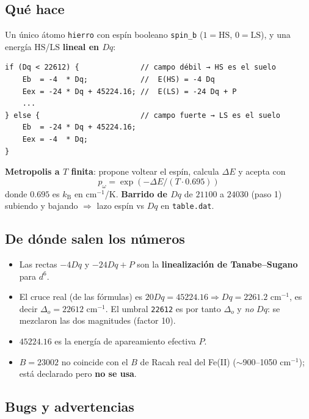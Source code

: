 \documentclass[11pt,a4paper]{article}
\newcommand{\HS}{\mathrm{HS}}
\newcommand{\LS}{\mathrm{LS}}
\newcommand{\Dq}{Dq}
\newcommand{\kb}{k_{\mathrm{B}}}
\begin{document}
\subsection{Qué hace}

Un único átomo \texttt{hierro} con espín booleano \texttt{spin\_b}
($1=\HS$, $0=\LS$), y una energía $\HS$/$\LS$ \textbf{lineal en $\Dq$}:

\begin{verbatim}
if (Dq < 22612) {              // campo débil → HS es el suelo
    Eb  = -4  * Dq;            //  E(HS) = -4 Dq
    Eex = -24 * Dq + 45224.16; //  E(LS) = -24 Dq + P
    ...
} else {                       // campo fuerte → LS es el suelo
    Eb  = -24 * Dq + 45224.16;
    Eex = -4  * Dq;
}
\end{verbatim}

\textbf{Metropolis a $T$ finita}: propone voltear el espín, calcula $\Delta E$ y
acepta con
\begin{equation}
p_{\omega} = \exp\!\left(-\Delta E/(T \cdot 0.695)\right)
\end{equation}
donde $0.695$ es $\kb$ en cm$^{-1}$/K. \textbf{Barrido de $\Dq$} de $21100$ a
$24030$ (paso 1) subiendo y bajando $\Rightarrow$ lazo espín vs $\Dq$ en
\texttt{table.dat}.

\subsection{De dónde salen los números}

\begin{itemize}
\item Las rectas $-4\Dq$ y $-24\Dq+P$ son la \textbf{linealización de
  Tanabe--Sugano} para $d^6$.
\item El cruce real (de las fórmulas) es $20\Dq = 45224.16 \Rightarrow
  \Dq = 2261.2$ cm$^{-1}$, es decir $\Delta_o = 22612$ cm$^{-1}$. El umbral
  \texttt{22612} es por tanto $\Delta_o$ y \emph{no} $\Dq$: se mezclaron las dos
  magnitudes (factor 10).
\item $45224.16$ es la energía de apareamiento efectiva $P$.
\item $B=23002$ no coincide con el $B$ de Racah real del Fe(II) ($\sim$900--1050
  cm$^{-1}$); está declarado pero \textbf{no se usa}.
\end{itemize}

\subsection{Bugs y advertencias}
\end{document}
